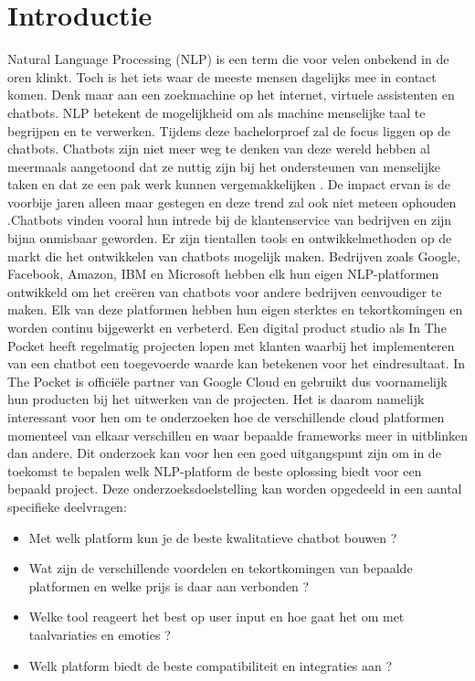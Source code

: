 
\section{Introductie} %
\label{sec:introductie}
Natural Language Processing (NLP) is een term die voor velen onbekend in de oren klinkt. Toch is het iets waar de meeste mensen dagelijks mee in contact komen. Denk maar aan een zoekmachine op het internet, virtuele assistenten en chatbots. NLP betekent de mogelijkheid om als machine menselijke taal te begrijpen en te verwerken. Tijdens deze bachelorproef zal de focus liggen op de chatbots. Chatbots zijn niet meer weg te denken van deze wereld hebben al meermaals aangetoond dat ze nuttig zijn bij het ondersteunen van menselijke taken en dat ze een pak werk kunnen vergemakkelijken \autocite{Atwell2007}.  De impact ervan is de voorbije jaren alleen maar gestegen en deze trend zal ook niet meteen ophouden \autocite{BRAIN2019}.Chatbots vinden vooral hun intrede bij de klantenservice van bedrijven en zijn bijna onmisbaar geworden. Er zijn tientallen tools en ontwikkelmethoden op de markt die het ontwikkelen van chatbots mogelijk maken. Bedrijven zoals Google, Facebook, Amazon, IBM en Microsoft hebben elk hun eigen NLP-platformen ontwikkeld om het creëren van chatbots voor andere bedrijven eenvoudiger te maken. Elk van deze platformen hebben hun eigen sterktes en tekortkomingen en worden continu bijgewerkt en verbeterd. Een digital product studio als In The Pocket heeft regelmatig projecten lopen met klanten waarbij het implementeren van een chatbot een toegevoerde waarde kan betekenen voor het eindresultaat. In The Pocket is officiële partner van Google Cloud en gebruikt dus voornamelijk hun producten bij het uitwerken van de projecten. Het is daarom namelijk interessant voor hen om te onderzoeken hoe de verschillende cloud platformen momenteel van elkaar verschillen en waar bepaalde frameworks meer in uitblinken dan andere. Dit onderzoek kan voor hen een goed uitgangspunt zijn om in de toekomst te bepalen welk NLP-platform de beste oplossing biedt voor een bepaald project. Deze onderzoeksdoelstelling kan worden opgedeeld in een aantal specifieke deelvragen:

\begin{itemize}
  \item Met welk platform kun je de beste kwalitatieve chatbot bouwen ?
  \item Wat zijn de verschillende voordelen en tekortkomingen van bepaalde platformen en welke prijs is daar aan verbonden ?
  \item Welke tool reageert het best op user input en hoe gaat het om met taalvariaties en emoties ?
  \item Welk platform biedt de beste compatibiliteit en integraties aan ?
\end{itemize}

